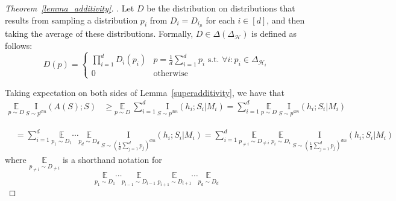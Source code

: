 \documentclass[final,12pt]{colt2018}
\newcommand{\EE}[1]{\underset{#1}{\mathbb{E}}}
\newcommand{\mc}[1]{\mathcal{#1}}
\newcommand{\cH}{\mc{H}}
\newcommand{\I}[2]{\underset{#1}{\mathrm{I}}\left(#2\right)}
\begin{document}
\begin{proof}[Theorem~\ref{lemma_additivity}].
	Let $D$ be the distribution on distributions that results from sampling a distribution $p_i$ from $D_i=D_{i_\mu}$ for each $i\in[d]$, and then taking the average of these distributions. Formally, $D \in \Delta(\Delta_\cH)$ is defined as follows:
	\[
	D(p) =  \begin{cases}
	\prod_{i=1}^d D_i(p_i) & p= \frac{1}{d}\sum_{i=1}^d p_i \text{ s.t. } \forall i: p_i \in \Delta_{\cH_i} \\
	0 & \text{otherwise}
	\end{cases}
	\]
	
	Taking expectation on both sides of Lemma~\ref{superadditivity}, we have that
	\begin{align*}
	\EE{p \sim D} \: \I{S \sim p^{dm}}{A(S);S} & \geq \EE{p \sim D} \: \sum_{i=1}^d \I{S \sim p^{dm}}{h_i;S_i|M_i} 
	 = \sum_{i=1}^d \EE{p \sim D} \: \I{S \sim p^{dm}}{h_i;S_i|M_i} 
	 \end{align*} 
	 
	 \begin{align*}
	& = \sum_{i=1}^d \EE{p_1 \sim D_1}\cdots\EE{p_d \sim D_d} \: \I{S \sim \left(\frac{1}{d}\sum_{j=1}^d p_j \right)^{dm}}{h_i;S_i|M_i} 
	 = \sum_{i=1}^d \EE{p_{\neq i} \sim D_{\neq i}} \: \EE{p_i \sim D_i} \: \I{S \sim \left(\frac{1}{d}\sum_{j=1}^d p_j \right)^{dm}}{h_i;S_i|M_i} 
	\end{align*}
	where $\EE{p_{\neq i} \sim D_{\neq i}}$ is a shorthand notation for
	\[
	\EE{p_1 \sim D_1}\cdots\EE{p_{i-1} \sim D_{i-1}} \: \EE{p_{i+1} \sim D_{i+1}}\cdots\EE{p_d \sim D_d}
	\]
	

\end{proof}
\end{document}
